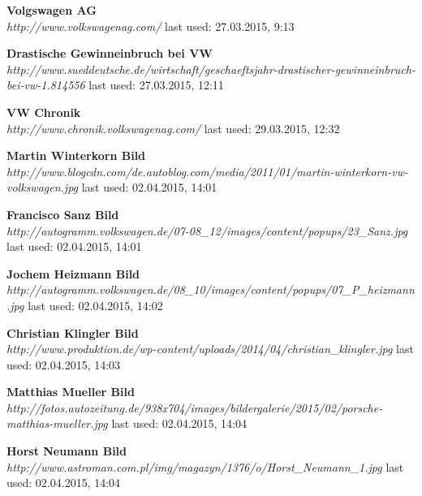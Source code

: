 \documentclass[12pt]{article}
\begin{document}
\begin{thebibliography}{56}
  \textbf{Volgswagen AG} \\
  \textit{
  	http://www.volkswagenag.com/
  }
  \newline last used: 27.03.2015, 9:13
  
  \textbf{Drastische Gewinneinbruch bei VW} \\
  \textit{
  	http://www.sueddeutsche.de/wirtschaft/geschaeftsjahr-drastischer-gewinneinbruch-bei-vw-1.814556
  }
  \newline last used: 27.03.2015, 12:11
  
  \textbf{VW Chronik} \\
  \textit{
  	http://www.chronik.volkswagenag.com/
  }
  \newline last used: 29.03.2015, 12:32

\textbf{Martin Winterkorn Bild} \\
\textit{
	http://www.blogcdn.com/de.autoblog.com/media/2011/01/martin-winterkorn-vw-volkswagen.jpg
}
\newline last used: 02.04.2015, 14:01

\textbf{Francisco Sanz Bild} \\
\textit{
	http://autogramm.volkswagen.de/07-08\_12/images/content/popups/23\_Sanz.jpg
}
\newline last used: 02.04.2015, 14:01

\textbf{Jochem Heizmann Bild} \\
\textit{
	http://autogramm.volkswagen.de/08\_10/images/content/popups/07\_P\_heizmann.jpg
}
\newline last used: 02.04.2015, 14:02

\textbf{Christian Klingler Bild} \\
\textit{
	http://www.produktion.de/wp-content/uploads/2014/04/christian\_klingler.jpg
}
\newline last used: 02.04.2015, 14:03

\textbf{Matthias Mueller Bild} \\
\textit{
	http://fotos.autozeitung.de/938x704/images/bildergalerie/2015/02/porsche-matthias-mueller.jpg
}
\newline last used: 02.04.2015, 14:04

\textbf{Horst Neumann Bild} \\
\textit{
	http://www.astroman.com.pl/img/magazyn/1376/o/Horst\_Neumann\_1.jpg
}
\newline last used: 02.04.2015, 14:04


\end{thebibliography}
\end{document}
